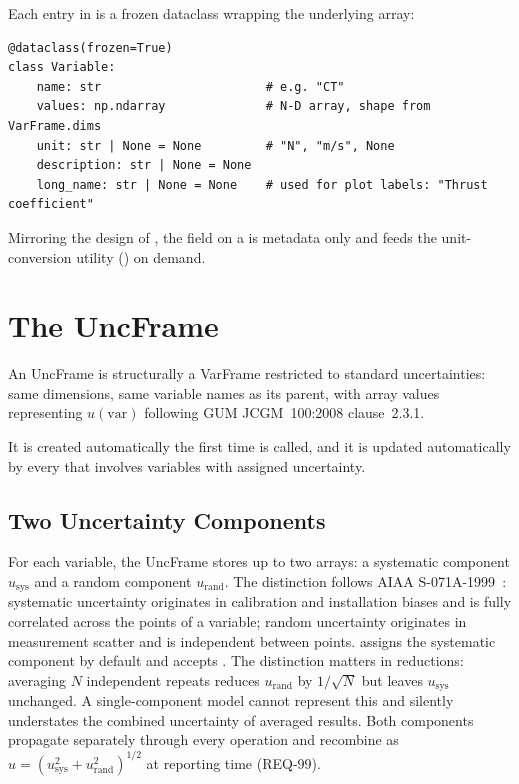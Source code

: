 Each entry in  is a frozen dataclass wrapping the underlying
array:

\begin{lstlisting}
@dataclass(frozen=True)
class Variable:
    name: str                       # e.g. "CT"
    values: np.ndarray              # N-D array, shape from VarFrame.dims
    unit: str | None = None         # "N", "m/s", None
    description: str | None = None
    long_name: str | None = None    # used for plot labels: "Thrust coefficient"
\end{lstlisting}

Mirroring the design of , the  field on a
 is metadata only and feeds the unit-conversion utility
() on demand.

\section{The UncFrame}

An UncFrame is structurally a VarFrame restricted to standard uncertainties:
same dimensions, same variable names as its parent, with array values
representing $u(\text{var})$ following GUM JCGM~100:2008 clause~2.3.1.

It is created automatically the first time 
is called, and it is updated automatically by every 
that involves variables with assigned uncertainty.

\subsection{Two Uncertainty Components}
\label{sec:two-components}

For each variable, the UncFrame stores up to two arrays: a systematic
component $u_{\mathrm{sys}}$ and a random component $u_{\mathrm{rand}}$.
The distinction follows AIAA S-071A-1999~\citep{aiaaS071A}: systematic
uncertainty originates in calibration and installation biases and is fully
correlated across the points of a variable; random uncertainty originates
in measurement scatter and is independent between points.
 assigns the systematic component by default and
accepts . The distinction matters in reductions:
averaging $N$ independent repeats reduces $u_{\mathrm{rand}}$ by
$1/\sqrt{N}$ but leaves $u_{\mathrm{sys}}$ unchanged. A single-component
model cannot represent this and silently understates the combined
uncertainty of averaged results. Both components propagate separately
through every operation and recombine as
$u = (u_{\mathrm{sys}}^2 + u_{\mathrm{rand}}^2)^{1/2}$ at reporting time
(REQ-99).


